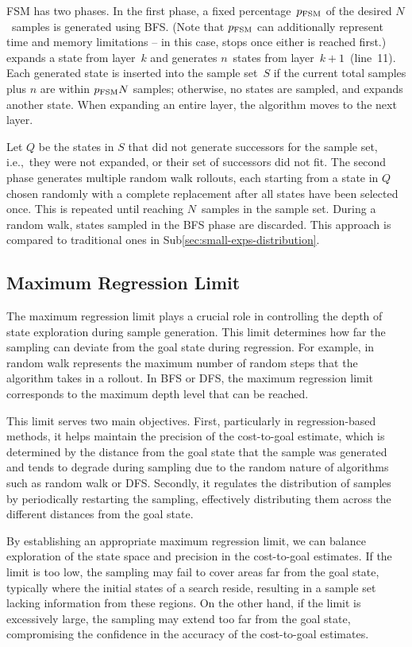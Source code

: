 FSM has two phases. In the first phase, a fixed percentage~$p_\text{FSM}$ of the desired $N$~samples is generated using BFS. (Note that $p_\text{FSM}$ can additionally represent time and memory limitations -- in this case, \bfs stops once either is reached first.) \bfs expands a state from layer~$k$ and generates $n$~states from layer~$k+1$~(line~11). Each generated state is inserted into the sample set~$S$ if the current total samples plus $n$ are within $p_{\text{FSM}}N$ samples; otherwise, no states are sampled, and \bfs expands another state. When expanding an entire layer, the algorithm moves to the next layer.

Let $Q$ be the states in $S$ that did not generate successors for the sample set, i.e.,~they were not expanded, or their set of successors did not fit. The second phase generates multiple random walk rollouts, each starting from a state in $Q$ chosen randomly with a complete replacement after all states have been selected once. This is repeated until reaching $N$~samples in the sample set. During a random walk, states sampled in the BFS phase are discarded. This approach is compared to traditional ones in Sub\cref{sec:small-exps-distribution}.

\subsection{Maximum Regression Limit}
\label{sec:rollout-limit}

The maximum regression limit plays a crucial role in controlling the depth of state exploration during sample generation. This limit determines how far the sampling can deviate from the goal state during regression. For example, in random walk represents the maximum number of random steps that the algorithm takes in a rollout. In BFS or DFS, the maximum regression limit corresponds to the maximum depth level that can be reached.

This limit serves two main objectives. First, particularly in regression-based methods, it helps maintain the precision of the cost-to-goal estimate, which is determined by the distance from the goal state that the sample was generated and tends to degrade during sampling due to the random nature of algorithms such as random walk or DFS. Secondly, it regulates the distribution of samples by periodically restarting the sampling, effectively distributing them across the different distances from the goal state.

By establishing an appropriate maximum regression limit, we can balance exploration of the state space and precision in the cost-to-goal estimates. If the limit is too low, the sampling may fail to cover areas far from the goal state, typically where the initial states of a search reside, resulting in a sample set lacking information from these regions. On the other hand, if the limit is excessively large, the sampling may extend too far from the goal state, compromising the confidence in the accuracy of the cost-to-goal estimates.

